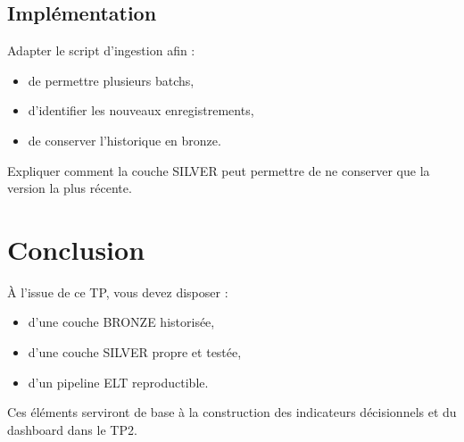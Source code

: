 \documentclass[11pt,a4paper]{article}
\begin{document}
\subsection*{Implémentation}

Adapter le script d’ingestion afin :

\begin{itemize}
  \item de permettre plusieurs batchs,
  \item d’identifier les nouveaux enregistrements,
  \item de conserver l’historique en bronze.
\end{itemize}

Expliquer comment la couche SILVER peut permettre de ne conserver que la version la plus récente.


\section*{Conclusion}

À l’issue de ce TP, vous devez disposer :

\begin{itemize}
  \item d’une couche BRONZE historisée,
  \item d’une couche SILVER propre et testée,
  \item d’un pipeline ELT reproductible.
\end{itemize}

Ces éléments serviront de base à la construction des indicateurs décisionnels
et du dashboard dans le TP2.
\end{document}
